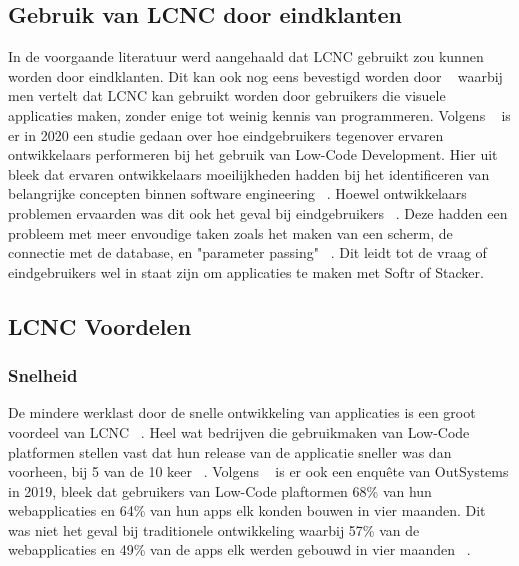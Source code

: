 \subsection*{Gebruik van LCNC door eindklanten}
\label{sub:gebruik-van-lcnc-door-eindklanten}
In de voorgaande literatuur werd aangehaald dat LCNC gebruikt zou kunnen worden door eindklanten. Dit kan ook nog eens bevestigd
worden door ~\textcite{Yan2021} waarbij men vertelt dat LCNC kan gebruikt worden door gebruikers die visuele applicaties maken, zonder enige tot weinig kennis van programmeren. 
Volgens ~\textcite{Hintsch2021} is er in 2020 een studie gedaan over hoe eindgebruikers tegenover ervaren ontwikkelaars performeren bij het gebruik van Low-Code Development.
Hier uit bleek dat ervaren ontwikkelaars moeilijkheden hadden bij het identificeren van belangrijke concepten binnen software engineering ~\autocite{Hintsch2021}. Hoewel ontwikkelaars problemen ervaarden was dit ook het geval bij eindgebruikers ~\autocite{Hintsch2021}. Deze hadden een probleem met meer envoudige taken zoals het maken van een scherm,
de connectie met de database, en "parameter passing" ~\autocite{Hintsch2021}. Dit leidt tot de vraag of eindgebruikers wel in staat zijn om applicaties te maken met Softr of Stacker.
\subsection*{LCNC Voordelen}
\label{sub:lcnc-voordelen}
\subsubsection*{Snelheid}
\label{sub:snelheid}
De mindere werklast door de snelle ontwikkeling van applicaties is een groot voordeel van LCNC ~\autocite{Adrian_2020}.
Heel wat bedrijven die gebruikmaken van Low-Code platformen stellen vast dat hun release van de applicatie sneller was dan voorheen, bij 5 van de 10 keer ~\autocite{Yan2021}.
Volgens ~\textcite{Yan2021} is er ook een enquête van OutSystems in 2019, bleek dat gebruikers van Low-Code plaftormen 68\% van hun webapplicaties en 64\% van hun apps elk konden bouwen in vier maanden.
Dit was niet het geval bij traditionele ontwikkeling waarbij 57\% van de webapplicaties en 49\% van de apps elk werden gebouwd in vier maanden ~\autocite{Yan2021}.

